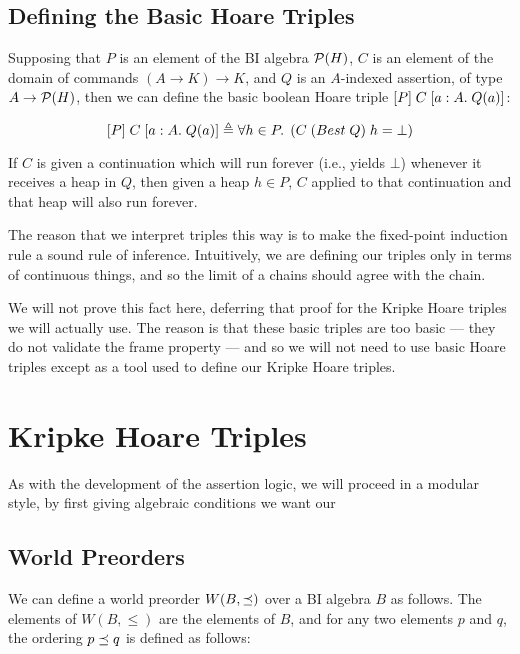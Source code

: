 \subsection{Defining the Basic Hoare Triples}

Supposing that $P$ is an element of the BI algebra $\mathcal{P}(H)$, $C$ is an element
of the domain of commands $(A \to K) \to K$, and $Q$ is an $A$-indexed assertion, of
type $A \to \mathcal{P}(H)$, then we can define the basic boolean Hoare triple 
$[{P}]\;{C}\;[{a:A}.\;{Q(a)}]$:

\begin{displaymath}
  [{P}]\;{C}\;[{a:A}.\;{Q(a)}] \triangleq
    \forall h \in P.\; \left(C\;(Best\;Q)\;h = \bot\right)
\end{displaymath}

If $C$ is given a continuation which will run forever (i.e., yields
$\bot$) whenever it receives a heap in $Q$, then given a heap $h \in
P$, $C$ applied to that continuation and that heap will also run forever.

The reason that we interpret triples this way is to make the
fixed-point induction rule a sound rule of inference. Intuitively, we
are defining our triples only in terms of continuous things, and so
the limit of a chains should agree with the chain.

We will not prove this fact here, deferring that proof for the Kripke
Hoare triples we will actually use. The reason is that these basic
triples are too basic --- they do not validate the frame property ---
and so we will not need to use basic Hoare triples except as a tool
used to define our Kripke Hoare triples.


\section{Kripke Hoare Triples}

As with the development of the assertion logic, we will proceed in a
modular style, by first giving algebraic conditions we want our  

\subsection{World Preorders}

We can define a world preorder $W(B, \preceq)$ over a BI algebra $B$ as
follows.  The elements of $W(B, \leq)$ are the elements of $B$, and for any
two elements $p$ and $q$, the ordering $p \preceq q$ is defined as
follows:

